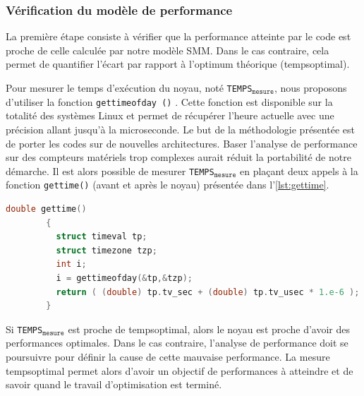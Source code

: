     \subsubsection{Vérification du modèle de performance}
    
        La première étape consiste à vérifier que la performance atteinte par le code est proche de celle calculée par notre modèle SMM. Dans le cas contraire, cela permet de quantifier l'écart par rapport à l'optimum théorique (\gls{tempsoptimal}). 
        
        Pour mesurer le temps d'exécution du noyau, noté \texttt{TEMPS}$_\texttt{mesure}$, nous proposons d'utiliser la fonction \verb|gettimeofday ()| \cite{Linux}. Cette fonction est disponible sur la totalité des systèmes Linux et permet de récupérer l'heure actuelle avec une précision allant jusqu'à la microseconde. Le but de la méthodologie présentée est de porter les codes sur de nouvelles architectures. Baser l'analyse de performance sur des compteurs matériels trop complexes aurait réduit la portabilité de notre démarche. Il est alors possible de mesurer  \texttt{TEMPS}$_\texttt{mesure}$ en plaçant deux appels à la fonction \verb|gettime()| (avant et après le noyau) présentée dans l'\autoref{lst:gettime}.
        
\begin{minipage}[]{\linewidth}%
         \begin{lstlisting}[language=c,caption=Fonction utilisée pour obtenir l'heure actuelle avec une précision allant jusqu'à la microseconde,label={lst:gettime}, 
          basicstyle=\footnotesize, frame=tb,
          xleftmargin=.065\textwidth, xrightmargin=.065\textwidth]
        double gettime()
        {
          struct timeval tp;
          struct timezone tzp;
          int i;
          i = gettimeofday(&tp,&tzp);
          return ( (double) tp.tv_sec + (double) tp.tv_usec * 1.e-6 );
        }
        \end{lstlisting}
\end{minipage}

        Si \texttt{TEMPS}$_\texttt{mesure}$ est proche de \gls{tempsoptimal}, alors le noyau est proche d'avoir des performances optimales. Dans le cas contraire, l'analyse de performance doit se poursuivre pour définir la cause de cette mauvaise performance. La mesure \gls{tempsoptimal} permet alors d'avoir un objectif de performances à atteindre et de savoir quand le travail d'optimisation est terminé.
        
    
